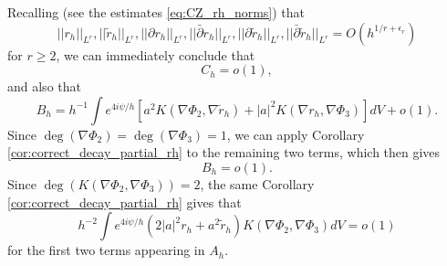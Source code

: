 \documentclass[12pt]{amsart}
\theoremstyle{definition}
\theoremstyle{remark}
\begin{document}
Recalling (see the estimates \eqref{eq:CZ_rh_norms}) that
\begin{equation}\label{eq:recall_rh_norms_cc}
||r_h||_{L^r}, ||\tilde r_h||_{L^r}, ||\partial r_h||_{L^r}, ||\bar\partial r_h||_{L^r}, ||\partial\tilde r_h||_{L^r}, ||\bar\partial\tilde r_h||_{L^r}=O(h^{1/r+\epsilon_r})
\end{equation}
for $r\geq 2$, 
we can immediately conclude that 
\begin{equation*}
C_h=o(1),
\end{equation*}
and also that
\begin{equation*}
B_h=h^{-1}\int e^{4i\psi/h}\left[ a^2K(\nabla\Phi_2,\nabla\tilde r_h)+|a|^2K(\nabla r_h,\nabla\Phi_3)\right]dV+o(1).
\end{equation*}
Since $\deg(\nabla\Phi_2)=\deg(\nabla\Phi_3)=1$, we can apply Corollary \ref{cor:correct_decay_partial_rh} to the remaining two terms, which then gives
\begin{equation*}
B_h=o(1).
\end{equation*}
Since $\deg(K(\nabla\Phi_2,\nabla\Phi_3))=2$, the same Corollary \ref{cor:correct_decay_partial_rh} gives that 
\begin{equation*}
h^{-2}\int e^{4i\psi/h}\left(2|a|^2 r_h+a^2\tilde r_h\right)K(\nabla\Phi_2,\nabla\Phi_3)dV=o(1)
\end{equation*}
for the first two terms appearing in $A_h$. 
\end{document}

